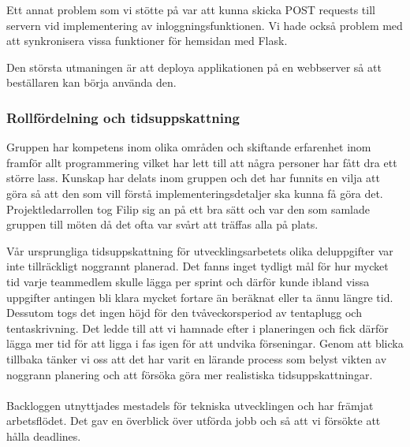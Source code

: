 \documentclass[12pt]{article}
\begin{document}
Ett annat problem som vi stötte på var att kunna skicka POST requests till servern vid implementering av inloggningsfunktionen. Vi hade också problem med att synkronisera vissa funktioner för hemsidan med Flask.

Den största utmaningen är att deploya applikationen på en webbserver så att beställaren kan börja använda den. 



\subsubsection{Rollfördelning och tidsuppskattning}

Gruppen har kompetens inom olika områden och skiftande erfarenhet inom framför allt programmering vilket har lett till att några personer har fått dra ett större lass. Kunskap har delats inom gruppen och det har funnits en vilja att göra så att den som vill förstå implementeringsdetaljer ska kunna få göra det. Projektledarrollen tog Filip sig an på ett bra sätt och var den som samlade gruppen till möten då det ofta var svårt att träffas alla på plats. 

Vår ursprungliga tidsuppskattning för utvecklingsarbetets olika deluppgifter var inte tillräckligt noggrannt planerad. Det fanns inget tydligt mål för hur mycket tid varje teammedlem skulle lägga per sprint och därför kunde ibland vissa uppgifter antingen bli klara mycket fortare än beräknat eller ta ännu längre tid. Dessutom togs det ingen höjd för den tvåveckorsperiod av tentaplugg och tentaskrivning. Det ledde till att vi hamnade efter i planeringen och fick därför lägga mer tid för att ligga i fas igen för att undvika förseningar. Genom att blicka tillbaka tänker vi oss att det har varit en lärande process som belyst vikten av noggrann planering och att försöka göra mer realistiska tidsuppskattningar. \\\\
Backloggen utnyttjades mestadels för tekniska utvecklingen och har främjat arbetsflödet. Det gav en överblick över utförda jobb och så att vi försökte att hålla deadlines.\\\

\end{document}
